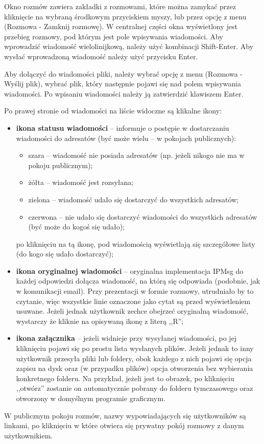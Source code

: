 \documentclass[11pt,leqno]{article}
\begin{document}
Okno rozmów zawiera zakładki z rozmowami, które można zamykać przez kliknięcie na wybraną środkowym
przyciskiem myszy, lub przez opcję z menu (Rozmowa - Zamknij rozmowę). W centralnej części okna
wyświetlony jest przebieg rozmowy, pod którym jest pole wpisywania wiadomości. Aby wprowadzić
wiadomość wielolinijkową, należy użyć kombinacji Shift-Enter. Aby wysłać wprowadzoną wiadomość należy
użyć przycisku Enter.

Aby dołączyć do wiadomości pliki, należy wybrać opcję z menu (Rozmowa - Wyślij plik), wybrać plik,
który następnie pojawi się nad polem wpisywania wiadomości. Po wpisaniu wiadomości należy ją
zatwierdzić klawiszem Enter.

Po prawej stronie od wiadomości na liście widoczne są klikalne ikony:
\begin{itemize}
	\item \textbf{ikona statusu wiadomości} -- informuje o postępie w dostarczaniu wiadomości
	do adresatów (być może wielu -- w pokojach publicznych):
	\begin{itemize}
		\item szara -- wiadomość nie posiada adresatów (np. jeżeli nikogo nie ma w pokoju publicznym);
		\item żółta -- wiadomość jest rozsyłana;
		\item zielona -- wiadomość udało się dostarczyć do wszystkich adresatów;
		\item czerwona -- nie udało się dostarczyć wiadomości do wszystkich adresatów (być może
		do kogoś się udało);
	\end{itemize}
	po kliknięciu na tą ikonę, pod wiadomością wyświetlają się szczegółowe listy (do kogo się udało
	dostarczyć);
	\item \textbf{ikona oryginalnej wiadomości} -- oryginalna implementacja IPMsg do każdej odpowiedzi
	dołącza wiadomość, na którą się odpowiada (podobnie, jak w komunikacji email). Przy prezentacji
	w formie rozmowy, utrudniało by to czytanie, więc wszystkie linie oznaczone jako cytat są
	przed wyświetleniem usuwane. Jeżeli jednak użytkownik zechce obejrzeć oryginalną wiadomość,
	wystarczy że kliknie na opisywaną ikonę z literą ,,R'';
	\item \textbf{ikona załącznika} -- jeżeli widnieje przy wysyłanej wiadomości, po jej kliknięciu
	pojawi się po prostu lista wysłanych plików. Jeżeli jednak to inny użytkownik przesyła pliki lub
	foldery, obok każdego z nich pojawi się opcja zapisu na dysk oraz (w przypadku plików) opcja
	otworzenia bez wybierania konkretnego folderu. Na przykład, jeżeli jest to obrazek, po kliknięciu
	,,otwórz'' zostanie on automatycznie pobrany do folderu tymczasowego oraz otworzony w domyślnym
	programie graficznym.
\end{itemize}

W publicznym pokoju rozmów, nazwy wypowiadających się użytkowników są linkami, po kliknięciu w które
otwiera się prywatny pokój rozmowy z danym użytkownikiem.
\end{document}
